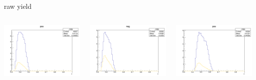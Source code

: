 \begin{frame}{raw yield}
\begin{columns}
\begin{column}[T]{0.25\textwidth}
\includegraphics[width = \textwidth]{results/yield/statistics/yield_x_Q2_z_0.50_5.500_0.40_pos.png}
\end{column}
\begin{column}[T]{0.25\textwidth}
\includegraphics[width = \textwidth]{results/yield/statistics/yield_x_Q2_z_0.50_5.500_0.40_neg.png}
\end{column}
\begin{column}[T]{0.25\textwidth}
\includegraphics[width = \textwidth]{results/yield/statistics/yield_x_Q2_z_0.50_5.500_0.50_pos.png}

\end{column}
\end{columns}
\end{frame}
